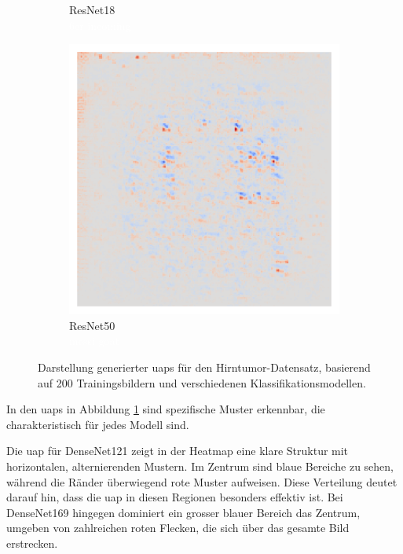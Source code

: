 \begin{figure}[H]
\begin{subfigure}{0.16\linewidth}
        \caption{ResNet18\\\textcolor{white}{6er incoming}}
    \end{subfigure}\hfill%
    \begin{subfigure}{0.16\linewidth}
        \centering
        \includegraphics[height=1\linewidth]{01-images/05-resultate/uap_resnet50/uap0-resnet50-mri_data-n200-robustificationslevel0.png}
        \caption{ResNet50\\\textcolor{white}{messi goat}}
    \end{subfigure}
    \caption{Darstellung generierter \acrshort{uap}s für den Hirntumor-Datensatz, basierend auf 200 Trainingsbildern und verschiedenen Klassifikationsmodellen.}
    \label{fig:unterschiedliche-uaps-mri}
\end{figure}

In den \acrshort{uap}s in Abbildung \ref{fig:unterschiedliche-uaps-mri} sind spezifische Muster erkennbar, die charakteristisch für jedes Modell sind. 

Die \acrlong{uap} für DenseNet121 zeigt in der Heatmap eine klare Struktur mit horizontalen, alternierenden Mustern. Im Zentrum sind blaue Bereiche zu sehen, während die Ränder überwiegend rote Muster aufweisen. Diese Verteilung deutet darauf hin, dass die \acrshort{uap} in diesen Regionen besonders effektiv ist. Bei DenseNet169 hingegen dominiert ein grosser blauer Bereich das Zentrum, umgeben von zahlreichen roten Flecken, die sich über das gesamte Bild erstrecken.

